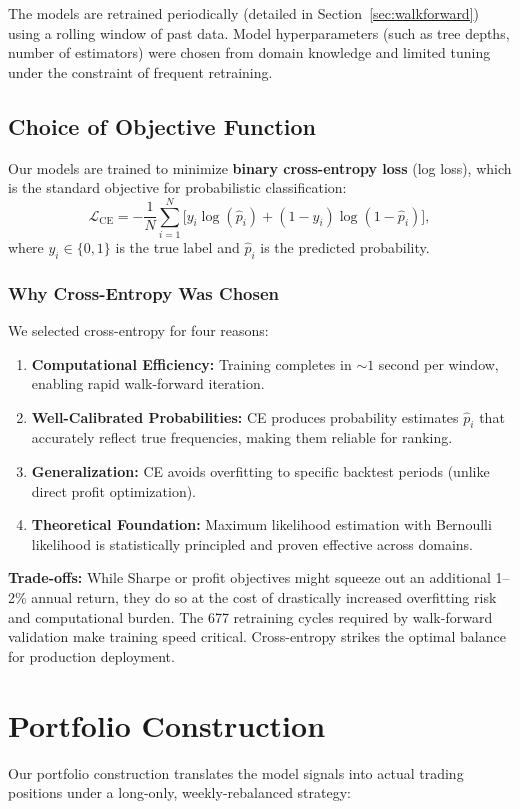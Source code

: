 \documentclass[conference]{IEEEtran}
\begin{document}
The models are retrained periodically (detailed in Section~\ref{sec:walkforward}) using a rolling window of past data. Model hyperparameters (such as tree depths, number of estimators) were chosen from domain knowledge and limited tuning under the constraint of frequent retraining.

\subsection{Choice of Objective Function}
Our models are trained to minimize \textbf{binary cross-entropy loss} (log loss), which is the standard objective for probabilistic classification:
\begin{equation}
\mathcal{L}_{\mathrm{CE}} = -\frac{1}{N}\sum_{i=1}^N\big[y_i \log(\hat{p}_i) + (1 - y_i)\log(1 - \hat{p}_i)\big],
\end{equation}
where $y_i \in \{0,1\}$ is the true label and $\hat{p}_i$ is the predicted probability.

\subsubsection{Why Cross-Entropy Was Chosen}
We selected cross-entropy for four reasons:
\begin{enumerate}
    \item \textbf{Computational Efficiency:} Training completes in $\sim 1$ second per window, enabling rapid walk-forward iteration.
    \item \textbf{Well-Calibrated Probabilities:} CE produces probability estimates $\hat{p}_i$ that accurately reflect true frequencies, making them reliable for ranking.
    \item \textbf{Generalization:} CE avoids overfitting to specific backtest periods (unlike direct profit optimization).
    \item \textbf{Theoretical Foundation:} Maximum likelihood estimation with Bernoulli likelihood is statistically principled and proven effective across domains.
\end{enumerate}

\textbf{Trade-offs:} While Sharpe or profit objectives might squeeze out an additional 1--2\% annual return, they do so at the cost of drastically increased overfitting risk and computational burden. The 677 retraining cycles required by walk-forward validation make training speed critical. Cross-entropy strikes the optimal balance for production deployment.

\section{Portfolio Construction}\label{sec:portfolio}
Our portfolio construction translates the model signals into actual trading positions under a long-only, weekly-rebalanced strategy:
\end{document}
